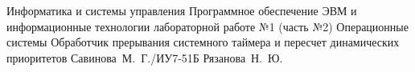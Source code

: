 \documentclass{bmstu}
\begin{document}
	
	\makereporttitle
	{Информатика и системы управления}
	{Программное обеспечение ЭВМ и информационные технологии}
	{лабораторной работе №1 (часть №2)}
	{Операционные системы}
	{Обработчик прерывания системного таймера и пересчет динамических приоритетов}
	{}
	{Савинова~М.~Г./ИУ7-51Б}
	{Рязанова~Н.~Ю.}
	
	\maketableofcontents

	
	
	
\end{document}
